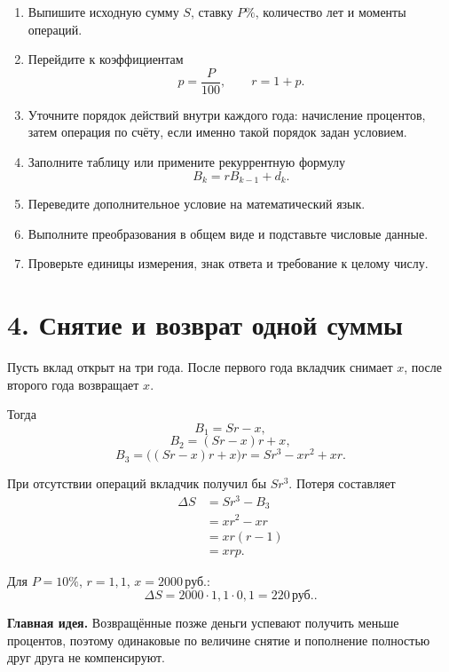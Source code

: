 \documentclass[a4paper,12pt]{article}
\newcommand{\key}[1]{\textcolor{darkaccent}{\textbf{#1}}}
\newcommand{\rub}{\,\text{руб.}}
\begin{document}
\begin{enumerate}
  \item Выпишите исходную сумму \(S\), ставку \(P\%\), количество лет
  и моменты операций.

  \item Перейдите к коэффициентам
  \[
    p=\frac{P}{100},
    \qquad
    r=1+p.
  \]

  \item Уточните порядок действий внутри каждого года: начисление
  процентов, затем операция по счёту, если именно такой порядок задан
  условием.

  \item Заполните таблицу или примените рекуррентную формулу
  \[
    B_k=rB_{k-1}+d_k.
  \]

  \item Переведите дополнительное условие на математический язык.

  \item Выполните преобразования в общем виде и подставьте числовые
  данные.

  \item Проверьте единицы измерения, знак ответа и требование к целому
  числу.
\end{enumerate}

\section*{4. Снятие и возврат одной суммы}

Пусть вклад открыт на три года. После первого года вкладчик снимает
\(x\), после второго года возвращает \(x\).

Тогда
\[
  B_1=Sr-x,
\]
\[
  B_2=(Sr-x)r+x,
\]
\[
  B_3
  =
  \bigl((Sr-x)r+x\bigr)r
  =
  Sr^3-xr^2+xr.
\]

При отсутствии операций вкладчик получил бы \(Sr^3\). Потеря составляет
\[
  \begin{aligned}
    \Delta S
    &=
    Sr^3-B_3
    \\
    &=
    xr^2-xr
    \\
    &=
    xr(r-1)
    \\
    &=
    xrp.
  \end{aligned}
\]

Для \(P=10\%\), \(r=1{,}1\), \(x=2000\rub\):
\[
  \Delta S
  =
  2000\cdot1{,}1\cdot0{,}1
  =
  \boxed{220\rub}.
\]

\key{Главная идея.}
Возвращённые позже деньги успевают получить меньше процентов, поэтому
одинаковые по величине снятие и пополнение полностью друг друга
не компенсируют.
\end{document}
